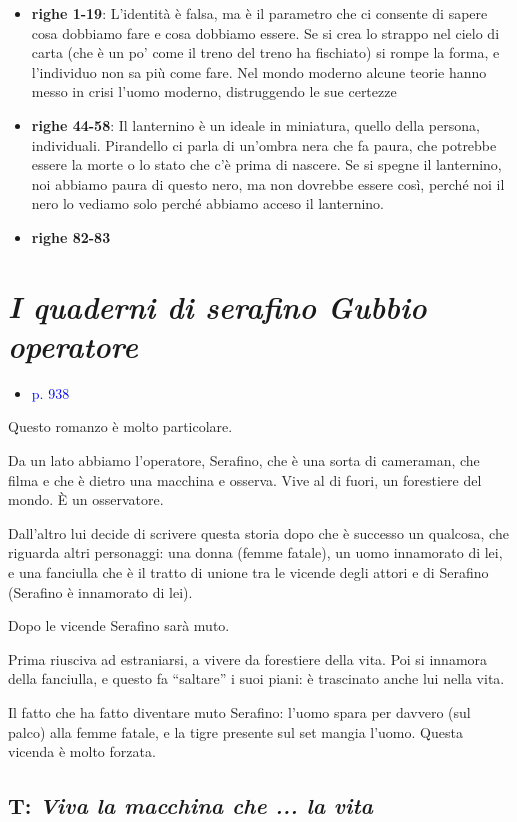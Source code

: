 \documentclass[a4paper, twoside, titlepage]{book}
\newcommand{\elenco}[1]{%
\begin{itemize}
#1
\end{itemize}}
\renewcommand{\emph}[1]{\textcolor{blue}{#1}}
\begin{document}
\elenco{\item \textbf{righe 1-19}:  L’identità è falsa, ma è il parametro che ci consente di sapere cosa dobbiamo fare e cosa dobbiamo essere. Se si crea lo strappo nel cielo di carta (che è un po’ come il treno del treno ha fischiato) si rompe la forma, e l’individuo non sa più come fare.
Nel mondo moderno alcune teorie hanno messo in crisi l’uomo moderno, distruggendo le sue certezze
\item \textbf{righe 44-58}: Il lanternino è un ideale in miniatura, quello della persona, individuali.
Pirandello ci parla di un’ombra nera che fa paura, che potrebbe essere la morte o lo stato che c’è prima di nascere.
Se si spegne il lanternino, noi abbiamo paura di questo nero, ma non dovrebbe essere così, perché noi il nero lo vediamo solo perché abbiamo acceso il lanternino.
\item \textbf{righe 82-83}}

\chapter{\textit{I quaderni di serafino Gubbio operatore}}
\elenco{\item \emph{p. 938}}

Questo romanzo è molto particolare.

Da un lato abbiamo l’operatore, Serafino, che è una sorta di cameraman, che filma e che è dietro una macchina e osserva. Vive al di fuori, un forestiere del mondo.
È un osservatore.

Dall’altro lui decide di scrivere questa storia dopo che è successo un qualcosa, che riguarda altri personaggi: una donna (femme fatale), un uomo innamorato di lei, e una fanciulla che è il tratto di unione tra le vicende degli attori e di Serafino (Serafino è innamorato di lei).

Dopo le vicende Serafino sarà muto.

Prima riusciva ad estraniarsi, a vivere da forestiere della vita. Poi si innamora della fanciulla, e questo fa “saltare” i suoi piani: è trascinato anche lui nella vita.

Il fatto che ha fatto diventare muto Serafino: l’uomo spara per davvero (sul palco) alla femme fatale, e la tigre presente sul set mangia l’uomo.
Questa vicenda è molto forzata.

\section{T: \textit{Viva la macchina che ... la vita}}
\end{document}
